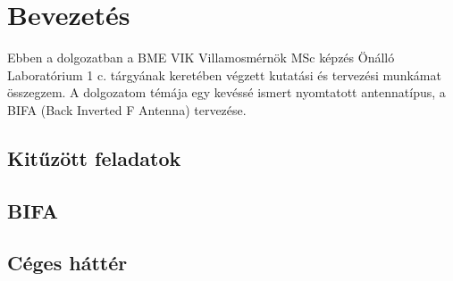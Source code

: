 \chapter{Bevezetés}
Ebben a dolgozatban a BME VIK Villamosmérnök MSc képzés Önálló Laboratórium 1 c. tárgyának keretében végzett kutatási és tervezési munkámat összegzem. A dolgozatom témája egy kevéssé ismert nyomtatott antennatípus, a BIFA (Back Inverted F Antenna) tervezése.
\section{Kitűzött feladatok}

\section{BIFA}

\section{Céges háttér}


